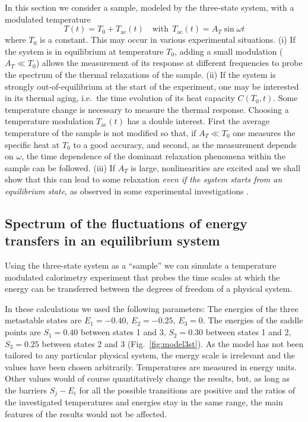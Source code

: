 \documentclass[pre,a4paper,twocolumn,superscriptaddress,%
floatfix]{revtex4}
\newcommand{\tac}{\ensuremath{T_{\mathrm{ac}}}}
\newcommand{\dtac}{\ensuremath{A_T}}
\begin{document}
In this section we consider a sample, modeled by the three-state system, with
a modulated temperature
\begin{equation}
  \label{eq:Tmodul}
 T(t) = T_0 + \tac (t) \quad{\mathrm{with~~}}  \tac(t) = \dtac \sin \omega t
\end{equation}
where $T_0$ is a
constant. This may occur in
various experimental situations. (i) If the system is in equilibrium at
temperature $T_0$, adding a small modulation ($\dtac \ll
T_0$) allows the measurement of its response at different frequencies to probe
the spectrum of the thermal relaxations of the sample. (ii) If the system is
strongly out-of-equilibrium at the start of the experiment, one may be
interested in its thermal aging, i.e.\ the time evolution of its heat capacity
$C(T_0,t)$. Some temperature change is necessary to measure the thermal
response. Choosing a temperature modulation $\tac(t)$ has a double
interest. First the average temperature of the sample is not modified so that,
if $\dtac \ll T_0$ one measures the specific heat at
$T_0$ to a good accuracy, and second, as
the measurement depends on $\omega$, the time dependence of the dominant
relaxation phenomena within the sample can be followed. (iii) If $\dtac$
is large, nonlinearities are excited and we shall show that
this can lead to some relaxation {\em even if the system starts from an
  equilibrium state}, as observed in some experimental investigations
\cite{WANG-JOHARI}.

\subsection{Spectrum of the fluctuations of energy transfers in an equilibrium system}
\label{se:spectrumequil}

Using the three-state system as a ``sample'' we can simulate a temperature
modulated 
calorimetry experiment that probes the time scales at which the energy can be
transferred between the degrees of freedom of a physical system.

In these calculations we used the following parameters: The energies of the
three metastable states are $E_1 = -0.40$, $E_2 = -0.25$, $E_3 = 0$.
The energies of the saddle points are $S_1 = 0.40$ between states 1 and 3,
$S_2 = 0.30$ between states 1 and 2, $S_3 = 0.25$ between states 2 and 3
(Fig.~\ref{fig:model3st}). As the model has not been tailored to any particular
physical system, the energy scale is irrelevant and the values have been
chosen arbitrarily. Temperatures are measured in energy units.
Other values would of course quantitatively change the results, but, as long
as the barriers $S_j - E_i$ for all the 
possible transitions are positive and the ratios of the investigated
temperatures and energies stay in the same range, the main features of the
results would not be affected.
\end{document}
